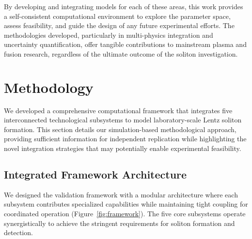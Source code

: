 \documentclass[12pt,a4paper]{article}
\begin{document}
By developing and integrating models for each of these areas, this work provides a self-consistent computational environment to explore the parameter space, assess feasibility, and guide the design of any future experimental efforts. The methodologies developed, particularly in multi-physics integration and uncertainty quantification, offer tangible contributions to mainstream plasma and fusion research, regardless of the ultimate outcome of the soliton investigation.

\section{Methodology}

We developed a comprehensive computational framework that integrates five interconnected technological subsystems to model laboratory-scale Lentz soliton formation. This section details our simulation-based methodological approach, providing sufficient information for independent replication while highlighting the novel integration strategies that may potentially enable experimental feasibility.

\subsection{Integrated Framework Architecture}

We designed the validation framework with a modular architecture where each subsystem contributes specialized capabilities while maintaining tight coupling for coordinated operation (Figure~\ref{fig:framework}). The five core subsystems operate synergistically to achieve the stringent requirements for soliton formation and detection.
\end{document}

